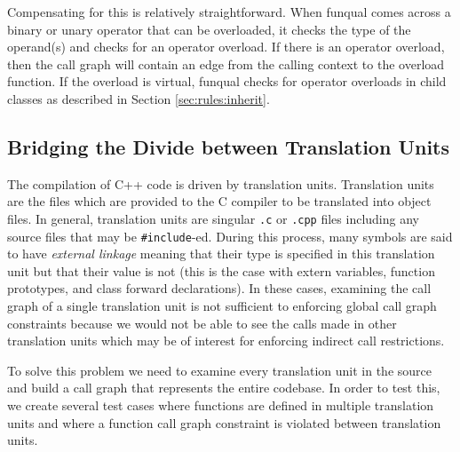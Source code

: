 Compensating for this is relatively straightforward.  When funqual comes across a binary or unary operator that can be overloaded, it checks the type of the operand(s) and checks for an operator overload.  If there is an operator overload, then the call graph will contain an edge from the calling context to the overload function.  If the overload is virtual, funqual checks for operator overloads in child classes as described in Section \ref{sec:rules:inherit}.

\subsection{Bridging the Divide between Translation Units}

The compilation of C++ code is driven by translation units.  Translation units are the files which are provided to the C compiler to be translated into object files.  In general, translation units are singular \lstinline{.c} or \lstinline{.cpp} files including any source files that may be \lstinline{#include}-ed.  During this process, many symbols are said to have \textit{external linkage} meaning that their type is specified in this translation unit but that their value is not (this is the case with extern variables, function prototypes, and class forward declarations).  In these cases, examining the call graph of a single translation unit is not sufficient to enforcing global call graph constraints because we would not be able to see the calls made in other translation units which may be of interest for enforcing indirect call restrictions.  

To solve this problem we need to examine every translation unit in the source and build a call graph that represents the entire codebase.  In order to test this, we create several test cases where functions are defined in multiple translation units and where a function call graph constraint is violated between translation units.
